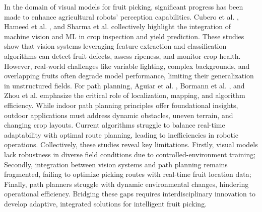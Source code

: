 \documentclass[a4paper,fleqn]{cas-dc}
\begin{document}
In the domain of visual models for fruit picking, significant progress has been made to enhance agricultural robots' perception capabilities. Cubero et al. \cite{cubero2016automated}, Hameed et al. \cite{hameed2018comprehensive}, and Sharma et al. \cite{sharma2020machine} collectively highlight the integration of machine vision and ML in crop inspection and yield prediction. These studies show that vision systems leveraging feature extraction and classification algorithms can detect fruit defects, assess ripeness, and monitor crop health. However, real-world challenges like variable lighting, complex backgrounds, and overlapping fruits often degrade model performance, limiting their generalization in unstructured fields.
For path planning, Aguiar et al. \cite{aguiar2020localization}, Bormann et al. \cite{bormann2018indoor}, and Zhou et al. \cite{zhou2022intelligent} emphasize the critical role of localization, mapping, and algorithm efficiency. While indoor path planning principles offer foundational insights, outdoor applications must address dynamic obstacles, uneven terrain, and changing crop layouts. Current algorithms struggle to balance real-time adaptability with optimal route planning, leading to inefficiencies in robotic operations.
Collectively, these studies reveal key limitations. Firstly, visual models lack robustness in diverse field conditions due to controlled-environment training; Secondly, integration between vision systems and path planning remains fragmented, failing to optimize picking routes with real-time fruit location data; Finally, path planners struggle with dynamic environmental changes, hindering operational efficiency. Bridging these gaps requires interdisciplinary innovation to develop adaptive, integrated solutions for intelligent fruit picking.
\end{document}
